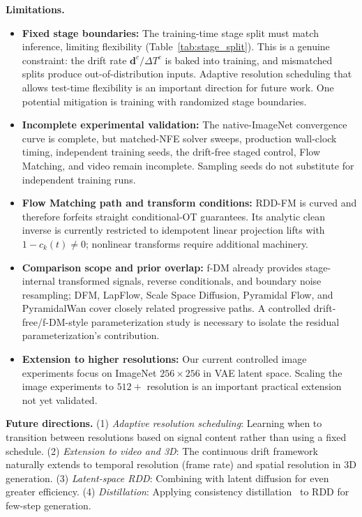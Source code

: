 \documentclass[10pt]{article}
\newcommand{\bd}{\bm{d}}
\begin{document}
\textbf{Limitations.}
\begin{itemize}
    \item \textbf{Fixed stage boundaries:} The training-time stage split must match inference, limiting flexibility (Table~\ref{tab:stage_split}). This is a genuine constraint: the drift rate $\bd^c / \Delta T^c$ is baked into training, and mismatched splits produce out-of-distribution inputs. Adaptive resolution scheduling that allows test-time flexibility is an important direction for future work. One potential mitigation is training with randomized stage boundaries.
    \item \textbf{Incomplete experimental validation:} The native-ImageNet convergence curve is complete, but matched-NFE solver sweeps, production wall-clock timing, independent training seeds, the drift-free staged control, Flow Matching, and video remain incomplete. Sampling seeds do not substitute for independent training runs.
    \item \textbf{Flow Matching path and transform conditions:} RDD-FM is curved and therefore forfeits straight conditional-OT guarantees. Its analytic clean inverse is currently restricted to idempotent linear projection lifts with $1-c_k(t)\neq0$; nonlinear transforms require additional machinery.
    \item \textbf{Comparison scope and prior overlap:} f-DM already provides stage-internal transformed signals, reverse conditionals, and boundary noise resampling; DFM, LapFlow, Scale Space Diffusion, Pyramidal Flow, and PyramidalWan cover closely related progressive paths. A controlled drift-free/f-DM-style parameterization study is necessary to isolate the residual parameterization's contribution.
    \item \textbf{Extension to higher resolutions:} Our current controlled image experiments focus on ImageNet $256\times256$ in VAE latent space. Scaling the image experiments to $512+$ resolution is an important practical extension not yet validated.
\end{itemize}

\textbf{Future directions.}
(1) \emph{Adaptive resolution scheduling}: Learning when to transition between resolutions based on signal content rather than using a fixed schedule.
(2) \emph{Extension to video and 3D}: The continuous drift framework naturally extends to temporal resolution (frame rate) and spatial resolution in 3D generation.
(3) \emph{Latent-space RDD}: Combining with latent diffusion for even greater efficiency.
(4) \emph{Distillation}: Applying consistency distillation~\citep{song2023consistency} to RDD for few-step generation.
\end{document}
